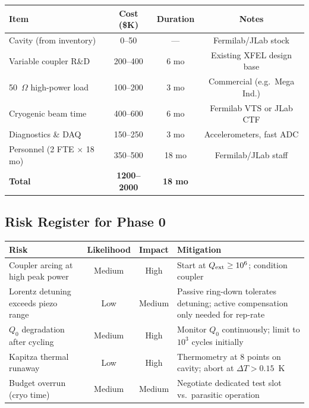 \documentclass[11pt]{article}
\begin{document}
\begin{center}
\begin{tabular}{lccc}
\toprule
Item & Cost (\$K) & Duration & Notes \\
\midrule
Cavity (from inventory) & 0--50 & --- & Fermilab/JLab stock \\
Variable coupler R\&D & 200--400 & 6 mo & Existing XFEL design base \\
50~$\Omega$ high-power load & 100--200 & 3 mo & Commercial (e.g.\ Mega Ind.) \\
Cryogenic beam time & 400--600 & 6 mo & Fermilab VTS or JLab CTF \\
Diagnostics \& DAQ & 150--250 & 3 mo & Accelerometers, fast ADC \\
Personnel (2 FTE $\times$ 18 mo) & 350--500 & 18 mo & Fermilab/JLab staff \\
\midrule
\textbf{Total} & \textbf{1200--2000} & \textbf{18 mo} & \\
\bottomrule
\end{tabular}
\end{center}

\subsection{Risk Register for Phase 0}

\begin{center}
\begin{tabular}{p{4cm}ccp{5cm}}
\toprule
Risk & Likelihood & Impact & Mitigation \\
\midrule
Coupler arcing at high peak power & Medium & High &
  Start at $Q_{\rm ext} \geq 10^6$; condition coupler \\
Lorentz detuning exceeds piezo range & Low & Medium &
  Passive ring-down tolerates detuning; active compensation
  only needed for rep-rate \\
$Q_0$ degradation after cycling & Medium & High &
  Monitor $Q_0$ continuously; limit to $10^3$ cycles initially \\
Kapitza thermal runaway & Low & High &
  Thermometry at 8 points on cavity; abort at $\Delta T > 0.15$~K \\
Budget overrun (cryo time) & Medium & Medium &
  Negotiate dedicated test slot vs.\ parasitic operation \\
\bottomrule
\end{tabular}
\end{center}

\end{document}
